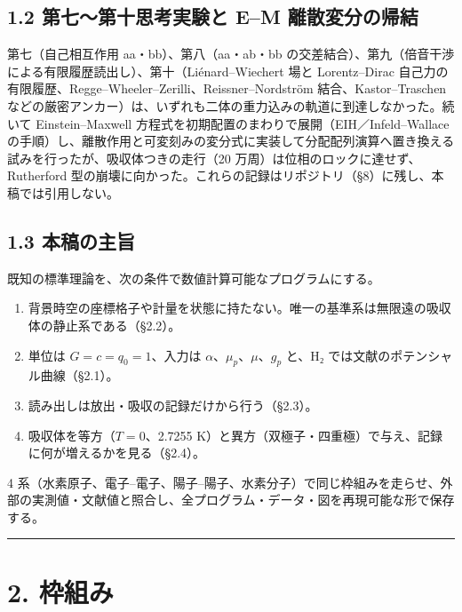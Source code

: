 \documentclass[
  a4paper,
]{ltjsarticle}
\providecommand{\tightlist}{%
  \setlength{\itemsep}{0pt}\setlength{\parskip}{0pt}}
\begin{document}
\subsection{1.2 第七〜第十思考実験と E--M
離散変分の帰結}\label{ux7b2cux4e03ux7b2cux5341ux601dux8003ux5b9fux9a13ux3068-em-ux96e2ux6563ux5909ux5206ux306eux5e30ux7d50}

第七（自己相互作用 aa・bb）、第八（aa・ab・bb
の交差結合）、第九（倍音干渉による有限履歴読出し）、第十（Liénard--Wiechert
場と Lorentz--Dirac
自己力の有限履歴、Regge--Wheeler--Zerilli、Reissner--Nordström
結合、Kastor--Traschen
などの厳密アンカー）は、いずれも二体の重力込みの軌道に到達しなかった。続いて
Einstein--Maxwell 方程式を初期配置のまわりで展開（EIH／Infeld--Wallace
の手順）し、離散作用と可変刻みの変分式に実装して分配配列演算へ置き換える試みを行ったが、吸収体つきの走行（20
万周）は位相のロックに達せず、Rutherford
型の崩壊に向かった。これらの記録はリポジトリ（§8）に残し、本稿では引用しない。

\subsection{1.3 本稿の主旨}\label{ux672cux7a3fux306eux4e3bux65e8}

既知の標準理論を、次の条件で数値計算可能なプログラムにする。

\begin{enumerate}
\def\labelenumi{\arabic{enumi}.}
\tightlist
\item
  背景時空の座標格子や計量を状態に持たない。唯一の基準系は無限遠の吸収体の静止系である（§2.2）。
\item
  単位は \(G=c=q_0=1\)、入力は \(\alpha\)、\(\mu_p\)、\(\mu\)、\(g_p\)
  と、H₂ では文献のポテンシャル曲線（§2.1）。
\item
  読み出しは放出・吸収の記録だけから行う（§2.3）。
\item
  吸収体を等方（\(T=0\)、2.7255
  K）と異方（双極子・四重極）で与え、記録に何が増えるかを見る（§2.4）。
\end{enumerate}

4
系（水素原子、電子--電子、陽子--陽子、水素分子）で同じ枠組みを走らせ、外部の実測値・文献値と照合し、全プログラム・データ・図を再現可能な形で保存する。

\begin{center}\rule{0.5\linewidth}{0.5pt}\end{center}

\section{2. 枠組み}\label{ux67a0ux7d44ux307f}
\end{document}
